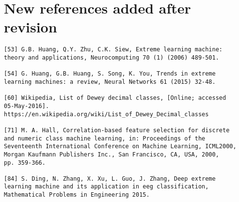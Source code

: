 \documentclass[preprint]{elsarticle}
\begin{document}
\section{New references added after revision}

\begin{verbatim}
[53] G.B. Huang, Q.Y. Zhu, C.K. Siew, Extreme learning machine: 
theory and applications, Neurocomputing 70 (1) (2006) 489-501.

[54] G. Huang, G.B. Huang, S. Song, K. You, Trends in extreme 
learning machines: a review, Neural Networks 61 (2015) 32-48.

[60] Wikipedia, List of Dewey decimal classes, [Online; accessed 
05-May-2016]. https://en.wikipedia.org/wiki/List_of_Dewey_Decimal_classes

[71] M. A. Hall, Correlation-based feature selection for discrete 
and numeric class machine learning, in: Proceedings of the 
Seventeenth International Conference on Machine Learning, ICML2000, 
Morgan Kaufmann Publishers Inc., San Francisco, CA, USA, 2000, 
pp. 359-366.

[84] S. Ding, N. Zhang, X. Xu, L. Guo, J. Zhang, Deep extreme 
learning machine and its application in eeg classification, 
Mathematical Problems in Engineering 2015.

\end{verbatim}
\end{document}
